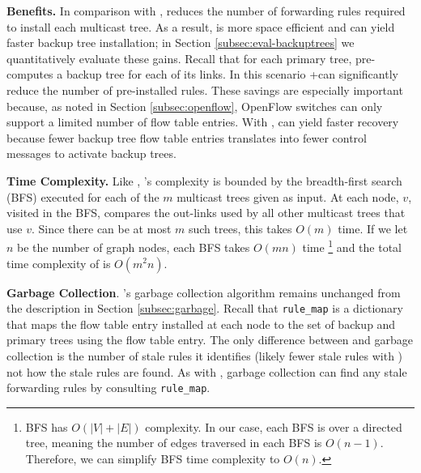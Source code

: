 {\bf Benefits.}
In comparison with \bases, \merge reduces the number of forwarding rules required to install each multicast tree.  As a result,
\merge is more space efficient and can yield faster backup tree installation; in Section \ref{subsec:eval-backuptrees} we quantitatively evaluate these gains.
Recall that for each primary tree, \mdr pre-computes a backup tree for each of its links.  In this scenario \pres+\merge can significantly reduce the number of pre-installed rules.
These savings are especially important because, as noted in Section \ref{subsec:openflow}, OpenFlow switches can only support a limited number of flow table entries.
With \posts, \merge can yield faster recovery because fewer backup tree flow table entries translates into fewer control messages to activate backup trees.

{\bf Time Complexity.}
Like \bases, \merges's complexity is bounded by the breadth-first search (BFS) executed for each of the $m$ multicast trees given as input.  At each node, $v$, visited in the BFS, \merge
compares the out-links used by all other multicast trees that use $v$.  Since there can be at most $m$ such trees, this takes $O(m)$ time.  If we let $n$ be the number of graph nodes,
each BFS takes $O(mn)$ time \footnote{BFS has $O(|V|+|E|)$ complexity. In our case, each BFS is over a directed tree, meaning the number of edges traversed in each BFS is $O(n-1)$.  
Therefore, we can simplify BFS time complexity to $O(n)$.}
and the total time complexity of \merge is $O(m^2n)$.


{\bf Garbage Collection}.
\mdrs's garbage collection algorithm remains unchanged from the description in Section \ref{subsec:garbage}.  
Recall that {\tt rule\_map} is a dictionary that maps the flow table entry installed at each node to the
set of backup and primary trees using the flow table entry. The only difference between \base and \merge garbage collection is the number of stale rules it identifies (likely fewer
stale rules with \merges) not how the stale rules are found.  
As with \bases, \merge garbage collection can find any stale forwarding rules by consulting {\tt rule\_map}.


